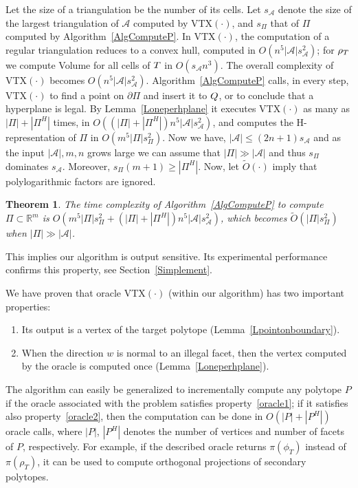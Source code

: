 \documentclass{article}
\newtheorem{theorem}{Theorem}
\def\RR{{\mathbb R}} \def\ZZ{{\mathbb Z}}
\def\A{{\mathcal A}} \def\R{{\mathcal R}}
\begin{document}
Let the size of a triangulation be the number of its cells.
Let $s_{\A}$ denote the size of the largest triangulation of $\A$
computed by {VTX}$(\cdot)$, and $s_{\varPi}$ that
of $\varPi$ computed by Algorithm~\ref{AlgComputeP}.
In {VTX}$(\cdot)$, the computation of a regular triangulation reduces to a
convex hull, computed in $O(n^5|\A|s_{\A}^2)$;
for $\rho_{{T}}$ we compute Volume for all cells of ${T}$ in $O(s_{\A} n^3)$.
The overall complexity of {VTX}$(\cdot)$ becomes $O(n^5|\A|s_{\A}^2)$.
Algorithm~\ref{AlgComputeP} calls, in every step, {VTX}$(\cdot)$ 
to find a point on $\partial \varPi$ and insert it to $Q$,
or to conclude that a hyperplane is legal.
By Lemma~\ref{Loneperhplane} it executes {VTX}$(\cdot)$ as many as 
$|\varPi|+|\varPi^H|$ 
times, in 
$O((|\varPi|+|\varPi^H|)n^5|\A| s_{\A}^2)$, and
computes the H-representation of $\varPi$ in $O(m^5|\varPi| s_{\varPi}^2)$.
Now we have,
$|\A|\leq(2n+1)s_{\A}$ and as the input $|\A|,m,n$ grows large
we can assume that $|\varPi|\gg |\A|$ and thus $s_{\varPi}$ dominates
$s_{\A}$. Moreover, $s_{\varPi}(m+1)\geq|\varPi^H|$.
Now, let
$\widetilde{O}(\cdot)$ imply that polylogarithmic factors are ignored.

\begin{theorem}\label{Ttotalcomplexity}
The time complexity of Algorithm~\ref{AlgComputeP} to compute $\varPi\subset\RR^m$
is $O(m^5|\varPi| s_{\varPi}^2+(|\varPi|+|\varPi^H|)n^5|\A| s_{\A}^2)$,
which becomes $\widetilde{O}(|\varPi| s_{\varPi}^2)$
when $|\varPi|\gg |\A|$.
\end{theorem}

This implies our algorithm is output sensitive.
Its experimental performance confirms this property, see Section~\ref{Simplement}.

We have proven that oracle {VTX}$(\cdot)$ (within our algorithm)
has two important properties:\\[-14pt]
\begin{enumerate}\itemsep0pt
 \item Its output is a vertex of the target polytope
(Lemma~\ref{Lpointonboundary})\label{oracle1}.
\item When the direction $w$ is normal to an illegal facet,
then the vertex computed by the oracle is computed once
(Lemma~\ref{Loneperhplane}).
\label{oracle2}\\[-14pt]
\end{enumerate}
The algorithm can easily be generalized to incrementally compute any
polytope $P$
if the oracle associated with the problem satisfies property~\eqref{oracle1}; if
it satisfies 
also property~\eqref{oracle2}, then the computation can be done in
$O(|P|+|P^H|)$ oracle calls, where 
$|P|$, $|P^H|$ denotes the number of vertices and number of facets of $P$,
respectively.
For example, if the described oracle returns $\pi(\phi_T)$ instead of
$\pi(\rho_T)$, it can be used to compute orthogonal projections of secondary
polytopes.
\end{document}
